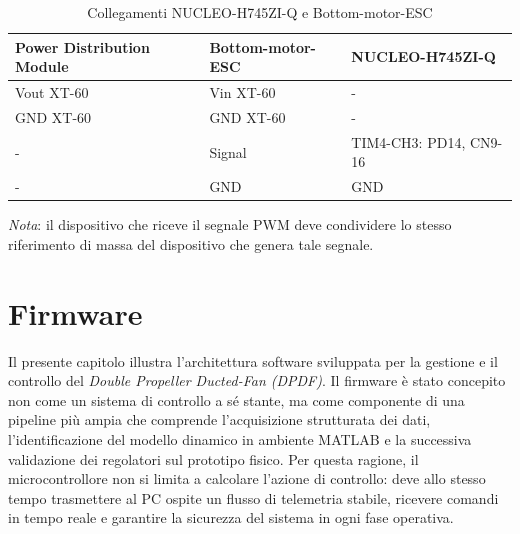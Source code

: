 \documentclass[11pt]{report}
\begin{document}
	\begin{table}[H]
		\centering
		\begin{tabular}{l l l}
			\toprule
			\textbf{Power Distribution Module} & \textbf{Bottom-motor-ESC} & \textbf{NUCLEO-H745ZI-Q} \\
			\midrule
			Vout XT-60 & Vin XT-60 & - \\
			GND XT-60  & GND XT-60 & - \\
			-          & Signal    & TIM4-CH3: PD14, CN9-16 \\
			-          & GND       & GND \\
			\bottomrule
		\end{tabular}
		\caption{Collegamenti NUCLEO-H745ZI-Q e Bottom-motor-ESC}
		\label{tab:coll_bottom_esc}
	\end{table}
	
	\textit{Nota}: il dispositivo che riceve il segnale PWM deve condividere lo stesso riferimento di massa del dispositivo che genera tale segnale.

\chapter{Firmware}
\label{ch:firmware}
Il presente capitolo illustra l'architettura software sviluppata per la gestione e il controllo del \textit{Double Propeller Ducted-Fan (DPDF)}. Il firmware è stato concepito non come un sistema di controllo a sé stante, ma come componente di una pipeline più ampia che comprende l'acquisizione strutturata dei dati, l'identificazione del modello dinamico in ambiente MATLAB e la successiva validazione dei regolatori sul prototipo fisico. Per questa ragione, il microcontrollore non si limita a calcolare l'azione di controllo: deve allo stesso tempo trasmettere al PC ospite un flusso di telemetria stabile, ricevere comandi in tempo reale e garantire la sicurezza del sistema in ogni fase operativa.
\end{document}
